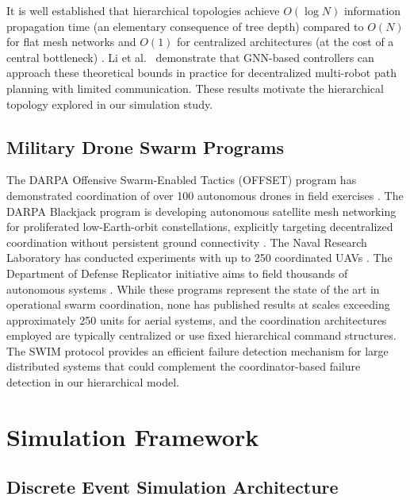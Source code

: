 \documentclass[journal]{IEEEtran}
\begin{document}
It is well established that hierarchical topologies achieve $O(\log N)$ information propagation time (an elementary consequence of tree depth) compared to $O(N)$ for flat mesh networks and $O(1)$ for centralized architectures (at the cost of a central bottleneck) \cite{lynch_distributed}. Li et al.~\cite{li_decentralized} demonstrate that GNN-based controllers can approach these theoretical bounds in practice for decentralized multi-robot path planning with limited communication. These results motivate the hierarchical topology explored in our simulation study.

\subsection{Military Drone Swarm Programs}

The DARPA Offensive Swarm-Enabled Tactics (OFFSET) program has demonstrated coordination of over 100 autonomous drones in field exercises \cite{darpa_offset}. The DARPA Blackjack program is developing autonomous satellite mesh networking for proliferated low-Earth-orbit constellations, explicitly targeting decentralized coordination without persistent ground connectivity \cite{darpa_blackjack}. The Naval Research Laboratory has conducted experiments with up to 250 coordinated UAVs \cite{nrl_swarm}. The Department of Defense Replicator initiative aims to field thousands of autonomous systems \cite{dod_replicator}. While these programs represent the state of the art in operational swarm coordination, none has published results at scales exceeding approximately 250 units for aerial systems, and the coordination architectures employed are typically centralized or use fixed hierarchical command structures. The SWIM protocol \cite{das_swim} provides an efficient failure detection mechanism for large distributed systems that could complement the coordinator-based failure detection in our hierarchical model.


\section{Simulation Framework}

\subsection{Discrete Event Simulation Architecture}
\end{document}
